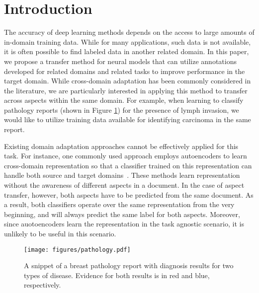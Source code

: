 \section{Introduction}

The accuracy of deep learning methods depends on the access to large amounts of in-domain training data. While for many applications, such data is not available, it is often possible to find labeled data in another related domain. In this paper, we propose a transfer method for neural models that can utilize annotations developed for related domains and related tasks to improve performance in the target domain. 
While cross-domain adaptation has been commonly considered in the literature, we are particularly interested in applying this method to transfer across aspects within the same domain. For example, when learning to classify pathology reports (shown in Figure \ref{fig:pathology}) for the presence of lymph invasion, we would like to utilize training data available for identifying carcinoma in the same report. %

Existing domain adaptation approaches cannot be effectively applied for this task. For instance, one commonly used approach employs autoencoders to learn cross-domain representation so that a classifier trained on this representation can handle both source and target domains~\cite{glorot2011domain,chen2012marginalized,chopra2013dlid}. These methods learn representation without the awareness of different aspects in a document. In the case of aspect transfer, however, both aspects have to be predicted from the same document. As a result, both classifiers operate over the same representation from the very beginning, and will always predict the same label for both aspects. Moreover, since auotoencoders learn the representation in the task agnostic scenario, it is unlikely to be useful in this scenario. 

\begin{figure}[t]
\centering
\texttt{[image: figures/pathology.pdf]}
\caption{A snippet of a breast pathology report with diagnosis results for two types of disease. Evidence for both results is in red and blue, respectively. }\label{fig:pathology}
\end{figure}

